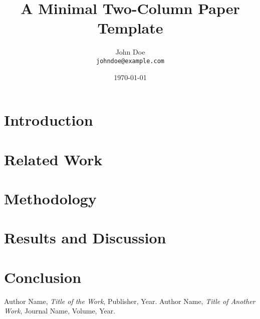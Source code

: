 \documentclass[10pt,twocolumn]{article}
\title{A Minimal Two-Column Paper Template}
\author{John Doe \\ \texttt{johndoe@example.com}}
\date{\today}
\begin{document}

\section{Introduction}
\lipsum[1] %

\section{Related Work}
\lipsum[2] %

\section{Methodology}
\lipsum[3] %

\section{Results and Discussion}
\lipsum[4] %

\section{Conclusion}
\lipsum[5] %

\begin{thebibliography}{99}
 Author Name, \emph{Title of the Work}, Publisher, Year.
 Author Name, \emph{Title of Another Work}, Journal Name, Volume, Year.
\end{thebibliography}
\end{document}
